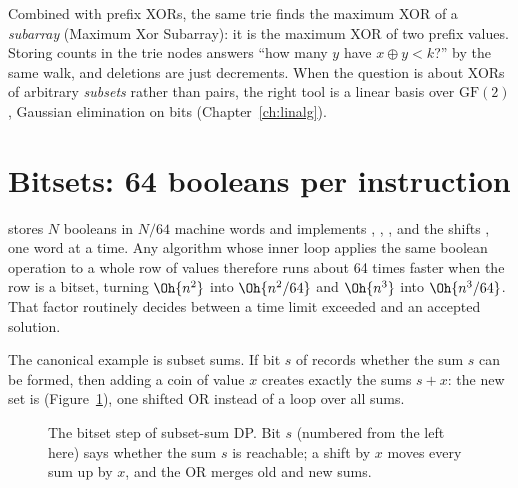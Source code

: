 
Combined with prefix XORs, the same trie finds the maximum XOR of a \emph{subarray} (Maximum Xor Subarray): it is the maximum
XOR of two prefix values. Storing counts in the trie nodes answers ``how many $y$ have $x \oplus y < k$?'' by the same walk,
and deletions are just decrements. When the question is about XORs of arbitrary \emph{subsets} rather than pairs, the right
tool is a linear basis over $\mathrm{GF}(2)$, Gaussian elimination on bits (Chapter~\ref{ch:linalg}).


\section[Bitsets]{Bitsets: 64 booleans per instruction \hfill \gold}\label{sec:bitset}

 stores $N$ booleans in $N/64$ machine words and implements \cc{&}, \cc{|}, \cc{^}, \cc{~} and the shifts
\cc{<<}, \cc{>>} one word at a time. Any algorithm whose inner loop applies the same boolean operation to a whole row of values
therefore runs about 64 times faster when the row is a bitset, turning $\Oh{n^2}$ into $\Oh{n^2/64}$ and $\Oh{n^3}$ into
$\Oh{n^3/64}$. That factor routinely decides between a time limit exceeded and an accepted solution.

The canonical example is subset sums. If bit $s$ of  records whether the sum $s$ can be formed, then adding a coin
of value $x$ creates exactly the sums $s + x$: the new set is  (Figure~\ref{fig:bitsetshift}), one
shifted OR instead of a loop over all sums.

\begin{figure}[htbp]
\centering
{}
\caption{The bitset step of subset-sum DP. Bit $s$ (numbered from the left here) says whether the sum $s$ is reachable; a
shift by $x$ moves every sum up by $x$, and the OR merges old and new sums.}
\label{fig:bitsetshift}
\end{figure}

